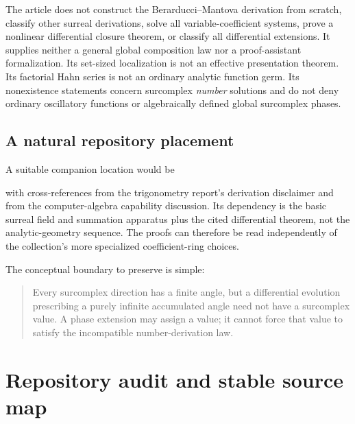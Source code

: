 \documentclass[11pt,letterpaper]{article}
\numberwithin{equation}{section}
\theoremstyle{definition}
\theoremstyle{remark}
\begin{document}
The article does not construct the Berarducci--Mantova derivation from scratch, classify other surreal derivations, solve all variable-coefficient systems, prove a nonlinear differential closure theorem, or classify all differential extensions. It supplies neither a general global composition law nor a proof-assistant formalization. Its set-sized localization is not an effective presentation theorem. Its factorial Hahn series is not an ordinary analytic function germ. Its nonexistence statements concern surcomplex \emph{number} solutions and do not deny ordinary oscillatory functions or algebraically defined global surcomplex phases.

\subsection{A natural repository placement}
A suitable companion location would be
\begin{center}
\end{center}
with cross-references from the trigonometry report's derivation disclaimer and from the computer-algebra capability discussion. Its dependency is the basic surreal field and summation apparatus plus the cited differential theorem, not the analytic-geometry sequence. The proofs can therefore be read independently of the collection's more specialized coefficient-ring choices.

The conceptual boundary to preserve is simple:
\begin{quote}
Every surcomplex direction has a finite angle, but a differential evolution prescribing a purely infinite accumulated angle need not have a surcomplex value. A phase extension may assign a value; it cannot force that value to satisfy the incompatible number-derivation law.
\end{quote}

\appendix
\section{Repository audit and stable source map}\label{app:audit}
\end{document}
